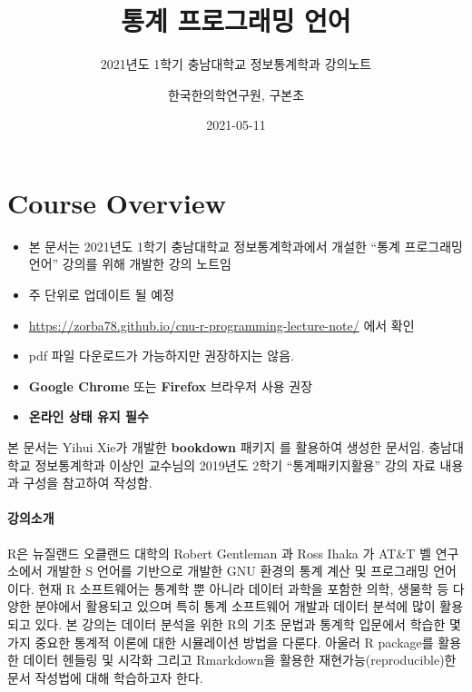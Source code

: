 \documentclass[
  11pt,
]{krantz}
\title{통계 프로그래밍 언어}
\subtitle{2021년도 1학기 충남대학교 정보통계학과 강의노트}
\author{한국한의학연구원, 구본초}
\date{2021-05-11}
\makeatletter
\providecommand{\tightlist}{%
  \setlength{\itemsep}{0pt}\setlength{\parskip}{0pt}}
\newenvironment{kframe}{%
\medskip{}
\setlength{\fboxsep}{.8em}
 \def\at@end@of@kframe{}%
 \ifinner\ifhmode%
  \def\at@end@of@kframe{\end{minipage}}%
  \begin{minipage}{\columnwidth}%
 \fi\fi%
 \def\FrameCommand##1{\hskip\@totalleftmargin \hskip-\fboxsep
 \colorbox{shadecolor}{##1}\hskip-\fboxsep
     \hskip-\linewidth \hskip-\@totalleftmargin \hskip\columnwidth}%
 \MakeFramed {\advance\hsize-\width
   \@totalleftmargin\z@ \linewidth\hsize
   \@setminipage}}%
 {\par\unskip\endMakeFramed%
 \at@end@of@kframe}
\newenvironment{rmdblock}[1]
  {
  \begin{itemize}
  \renewcommand{\labelitemi}{
    \raisebox{-.7\height}[0pt][0pt]{
      {\setkeys{Gin}{width=3em,keepaspectratio}\texttt{[image: images/\#1]}}
    }
  }
  \setlength{\fboxsep}{1em}
  \begin{kframe}
  \item
  }
  {
  \end{kframe}
  \end{itemize}
  }
\newenvironment{rmdnote}
  {\begin{rmdblock}{note}}
  {\end{rmdblock}}
\makeatother
\begin{document}
\maketitle

{
\hypersetup{linkcolor=}
\setcounter{tocdepth}{2}
\tableofcontents
}
\listoftables
\listoffigures
\hypertarget{overview}{%
\chapter*{Course Overview}\label{overview}}


\begin{rmdnote}
\begin{itemize}
\tightlist
\item
  본 문서는 2021년도 1학기 충남대학교 정보통계학과에서 개설한 ``통계 프로그래밍 언어'' 강의를 위해 개발한 강의 노트임
\item
  주 단위로 업데이트 될 예정
\item
  \url{https://zorba78.github.io/cnu-r-programming-lecture-note/} 에서 확인
\item
  pdf 파일 다운로드가 가능하지만 권장하지는 않음.
\item
  \textbf{Google Chrome} 또는 \textbf{Firefox} 브라우저 사용 권장
\item
  \textbf{온라인 상태 유지 필수}
\end{itemize}

본 문서는 Yihui Xie가 개발한 \textbf{bookdown} 패키지 \citep{xie-2016}를 활용하여 생성한 문서임. 충남대학교 정보통계학과 이상인 교수님의 2019년도 2학기 ``통계패키지활용''
강의 자료 내용과 구성을 참고하여 작성함.
\end{rmdnote}

\hypertarget{intro-lec}{%
\subsubsection*{강의소개}\label{intro-lec}}


R은 뉴질랜드 오클랜드 대학의 Robert Gentleman 과 Ross Ihaka 가 AT\&T 벨 연구소에서 개발한 S 언어를 기반으로 개발한 GNU 환경의 통계 계산 및 프로그래밍 언어이다. 현재 R 소프트웨어는 통계학 뿐 아니라 데이터 과학을 포함한 의학, 생물학 등 다양한 분야에서 활용되고 있으며 특히 통계 소프트웨어 개발과 데이터 분석에 많이 활용되고 있다. 본 강의는 데이터 분석을 위한 R의 기초 문법과 통계학 입문에서 학습한 몇 가지 중요한 통계적 이론에 대한 시뮬레이션 방법을 다룬다. 아울러 R package를 활용한 데이터 헨들링 및 시각화 그리고 Rmarkdown을 활용한 재현가능(reproducible)한 문서 작성법에 대해 학습하고자 한다.
\end{document}
